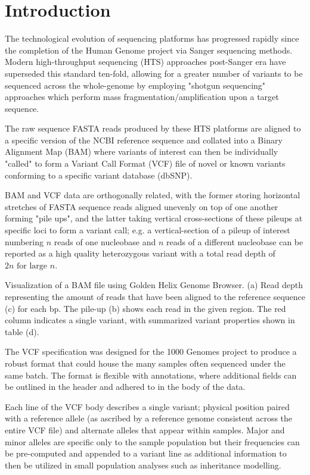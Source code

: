 
\section{Introduction}

\enlargethispage{30pt}

The technological evolution of sequencing platforms has progressed rapidly since the completion of the Human Genome project via Sanger sequencing methods. Modern high-throughput sequencing (HTS) approaches post-Sanger era have superseded this standard ten-fold, allowing for a greater number of variants to be sequenced across the whole-genome by employing "shotgun sequencing" approaches which perform mass fragmentation/amplification upon a target sequence.

The raw sequence FASTA reads produced by these HTS platforms are aligned to a specific version of the NCBI reference sequence and collated into a Binary Alignment Map (BAM) where variants of interest can then be individually "called" to form a Variant Call Format (VCF) file of novel or known variants conforming to a specific variant database (dbSNP).

BAM and VCF data are orthogonally related, with the former storing horizontal stretches of FASTA sequence reads aligned unevenly on top of one another forming "pile ups", and the latter taking vertical cross-sections of these pileups at specific loci to form a variant call; e.g.  a vertical-section of a pileup of interest numbering $n$ reads of one nucleobase and $n$ reads of a different nucleobase can be reported as a high quality heterozygous variant with a total read depth of $2n \text{ for large } n$.

{Visualization of a BAM file using Golden Helix Genome Browser. (a) Read depth representing the amount of reads that have been aligned to the reference sequence (c) for each bp. The pile-up (b) shows each read in the given region. The red column indicates a single variant, with summarized variant properties shown in table (d).}

The VCF specification was designed for the 1000 Genomes project to produce a robust format that could house the many samples often sequenced under the same batch. The format is flexible with annotations, where additional fields can be outlined in the header and adhered to in the body of the data. 

Each line of the VCF body describes a single variant; physical position paired with a reference allele (as ascribed by a reference genome consistent across the entire VCF file) and alternate alleles that appear within samples. Major and minor alleles are specific only to the sample population but their frequencies can be pre-computed and appended to a variant line as additional information to then be utilized in small population analyses such as inheritance modelling.


